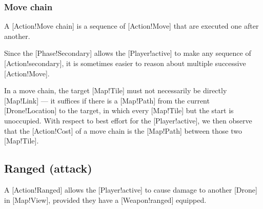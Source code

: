 \subsubsection{Move chain}

A [Action!Move chain] is a sequence of [Action!Move] that are executed one after another.

Since the [Phase!Secondary] allows the [Player!active] to make any sequence of [Action!secondary], it is sometimes easier to reason about multiple successive [Action!Move].

In a move chain, the target [Map!Tile] must not necessarily be directly [Map!Link] --- it suffices if there is a [Map!Path] from the current [Drone!Location] to the target, in which every [Map!Tile] but the start is unoccupied.
With respect to best effort for the [Player!active], we then observe that the [Action!Cost] of a move chain is the [Map!Path] between those two [Map!Tile].

\subsection{Ranged (attack)}

A [Action!Ranged] allows the [Player!active] to cause damage to another [Drone] in [Map!View], provided they have a [Weapon!ranged] equipped.

